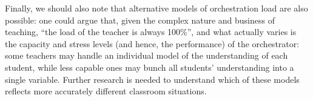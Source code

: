 \documentclass[10pt,journal,compsoc]{IEEEtran}
\begin{document}
Finally, we should also note that alternative models of orchestration load are also possible: one could argue that, given the complex nature and business of teaching, ``the load of the teacher is always 100\%'', and what actually varies is the capacity and stress levels (and hence, the performance) of the orchestrator: some teachers may handle an individual model of the understanding of each student, while less capable ones may bunch all students' understanding into a single variable. Further research is needed to understand which of these models reflects more accurately different classroom situations.


\end{document}
